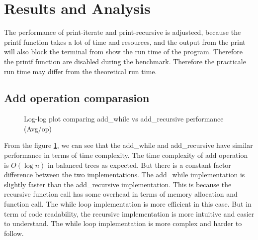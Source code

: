 \documentclass[a4paper,11pt]{article}
\begin{document}
\section*{Results and Analysis}
The performance of print-iterate and print-recursive is adjustecd, because the printf function takes a lot of time and resources, and the output from the print will also block the terminal from show the run time of the program. Therefore the printf function are disabled during the benchmark. Therefore the practicale run time may differ from the theoretical run time.

\subsection*{Add operation comparasion}

\begin{figure}[h]
    \centering
    \caption{Log-log plot comparing add\_while vs add\_recursive performance (Avg/op)}
    \label{fig:add_operations_comparison}
\end{figure}
From the figure \ref{fig:add_operations_comparison}, we can see that the add\_while and add\_recursive have similar performance in terms of time complexity. The time complexity of add operation is $O(\log n)$ in balanced trees as expected. But there is a constant factor difference between the two implementations. The add\_while implementation is slightly faster than the add\_recursive implementation. 
This is because the recursive function call has some overhead in terms of memory allocation and function call. The while loop implementation is more efficient in this case.
But in term of code readability, the recursive implementation is more intuitive and easier to understand. The while loop implementation is more complex and harder to follow.
\end{document}
